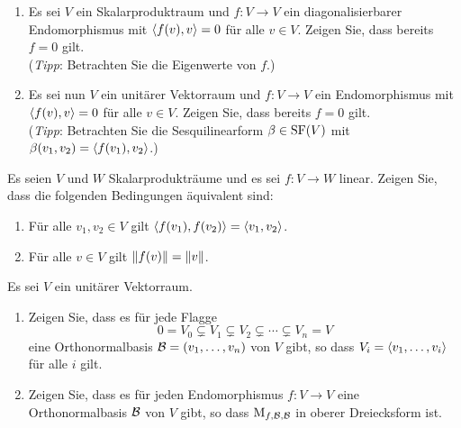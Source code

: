 \documentclass[a4paper, 10pt]{scrartcl}
\begin{document}
\begin{question}[subtitle = Endomorphismen mit {$\bil{f(v)}{v} = 0$}]
  \begin{enumerate}
    \item
      Es sei $V$ ein Skalarproduktraum und $f \colon V \to V$ ein diagonalisierbarer Endomorphismus mit $\bil{f(v)}{v} = 0$ für alle $v \in V$.
      Zeigen Sie, dass bereits $f = 0$ gilt.
      \\
      (\emph{Tipp}:
      Betrachten Sie die Eigenwerte von $f$.)
    \item
      Es sei nun $V$ ein unitärer Vektorraum und $f \colon V \to V$ ein Endomorphismus mit $\bil{f(v)}{v} = 0$ für alle $v \in V$.
      Zeigen Sie, dass bereits $f = 0$ gilt.
      \\
      (\emph{Tipp}:
       Betrachten Sie die Sesquilinearform $\beta \in \operatorname{SF}(V)$ mit $\beta(v_1, v_2) = \left\langle f(v_1), v_2 \right\rangle$.)
  \end{enumerate}
\end{question}





\begin{question}
  Es seien $V$ und $W$ Skalarprodukträume und es sei $f \colon V \to W$ linear.
  Zeigen Sie, dass die folgenden Bedingungen äquivalent sind:
  \begin{enumerate}
    \item
      Für alle $v_1, v_2 \in V$ gilt $\left\langle f(v_1), f(v_2) \right\rangle = \left\langle v_1, v_2 \right\rangle$.
    \item
      Für alle $v \in V$ gilt $\left\| f(v) \right\| = \left\| v \right\|$.
  \end{enumerate}
\end{question}





\begin{question}
  Es sei $V$ ein unitärer Vektorraum.
  \begin{enumerate}
    \item
      Zeigen Sie, dass es für jede Flagge
      \[
                    0
        =           V_0
        \subsetneq  V_1
        \subsetneq  V_2
        \subsetneq  \dotsb
        \subsetneq  V_n
        =           V
      \]
      eine Orthonormalbasis $\mathcal{B} = (v_1, \dotsc, v_n)$ von $V$ gibt, so dass $V_i = \left\langle v_1, \dotsc, v_i \right\rangle$ für alle $i$ gilt.
    \item
      Zeigen Sie, dass es für jeden Endomorphismus $f \colon V \to V$ eine Orthonormalbasis $\mathcal{B}$ von $V$ gibt, so dass $\operatorname{M}_{f, \mathcal{B}, \mathcal{B}}$ in oberer Dreiecksform ist.
  \end{enumerate}
\end{question}
\end{document}
